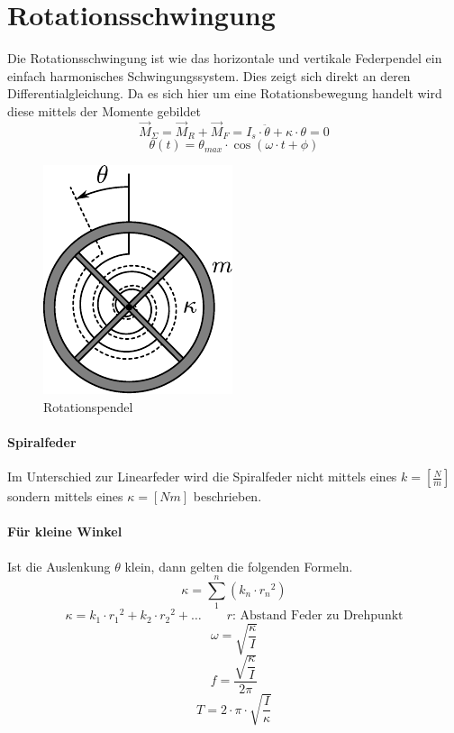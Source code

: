 \section{Rotationsschwingung}
Die Rotationsschwingung ist wie das horizontale und vertikale Federpendel
ein einfach harmonisches Schwingungssystem. Dies zeigt sich direkt an deren
Differentialgleichung. Da es sich hier um eine Rotationsbewegung handelt 
wird diese mittels der Momente gebildet
\[ \boxed{\vec{M}_{\Sigma} 
	= \vec{M}_R + \vec{M}_F 
	= I_s \cdot \ddot{\theta} + \kappa \cdot \theta = 0
} \]
\[ \boxed{\theta(t) = \theta_{max} \cdot \cos(\omega \cdot t + \phi)} \]

\begin{figure}[h!]
	\centering
	\includegraphics[scale=0.75]{../fig/rotationspendel.pdf}
	\caption{Rotationspendel}
\end{figure}

\paragraph{Spiralfeder} Im Unterschied zur Linearfeder wird die Spiralfeder
nicht mittels eines $k=\left[\frac{N}{m}\right]$ sondern mittels eines
$\kappa=\left[Nm\right]$ beschrieben.

\paragraph{Für kleine Winkel} Ist die Auslenkung $\theta$ klein, dann gelten
 die folgenden Formeln.
\[ \boxed{\kappa = \sum_{1}^{n} \left(k_n \cdot {r_n}^2\right)} \]
\[ \boxed{\kappa = k_1 \cdot {r_1}^2 + k_2 \cdot {r_2}^2 + \dots } \qquad 
\text{$r$: Abstand Feder zu Drehpunkt} \]
\[ \boxed{\omega = \sqrt{\frac{\kappa}{I}}} \]
\[ \boxed{f = \frac{\sqrt{\dfrac{\kappa}{I}}}{2 \pi}} \]
\[ \boxed{T = 2 \cdot \pi \cdot \sqrt{\frac{I}{\kappa}}} \]
